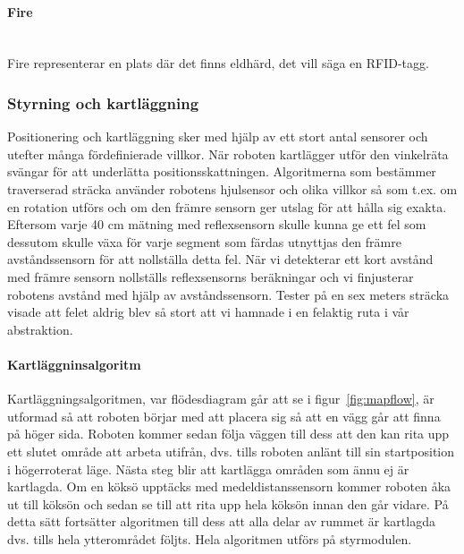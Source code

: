 \documentclass[a4paper,12pt,fleqn]{article}
\begin{document}
\paragraph{Fire} 
~\\
Fire representerar en plats där det finns eldhärd, det vill säga en RFID-tagg. 
\newpage

\subsubsection{Styrning och kartläggning}
Positionering och kartläggning sker med hjälp av ett stort antal sensorer och utefter många fördefinierade villkor. När roboten kartlägger utför den vinkelräta svängar för att underlätta positionsskattningen. Algoritmerna som bestämmer traverserad sträcka använder robotens hjulsensor och olika villkor så som t.ex.  om en rotation utförs och om den främre sensorn ger utslag för att hålla sig exakta. Eftersom varje 40 cm mätning med reflexsensorn skulle kunna ge ett fel som dessutom skulle växa för varje segment som färdas utnyttjas den främre avståndssensorn för att nollställa detta fel. När vi detekterar ett kort avstånd med främre sensorn nollställs reflexsensorns beräkningar och vi finjusterar robotens avstånd med hjälp av avståndssensorn. Tester på en sex meters sträcka visade att felet aldrig blev så stort att vi hamnade i en felaktig ruta i vår abstraktion. 

\paragraph{Kartläggninsalgoritm}

Kartläggningsalgoritmen, var flödesdiagram går att se i figur~\ref{fig:mapflow}, är utformad så att roboten börjar med att placera sig så att en vägg går att finna på höger sida. Roboten kommer sedan följa väggen till dess att den kan rita upp ett slutet område att arbeta utifrån, dvs. tills roboten anlänt till sin startposition i högerroterat läge. Nästa steg blir att kartlägga områden som ännu ej är kartlagda. Om en köksö upptäcks med medeldistanssensorn kommer roboten åka ut till köksön och sedan se till att rita upp hela köksön innan den går vidare. På detta sätt fortsätter algoritmen till dess att alla delar av rummet är kartlagda dvs. tills hela ytterområdet följts. Hela algoritmen utförs på styrmodulen.
\end{document}
